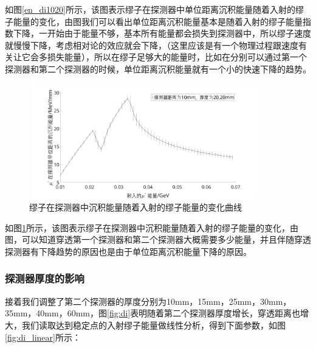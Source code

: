 \documentclass[UTF8]{ctexart}
\begin{document}
如图\ref{en_di1020}所示，该图表示缪子在探测器中单位距离沉积能量随着入射的缪子能量的变化，由图我们可以看出单位距离沉积能量基本是随着入射的缪子能量指数下降，一开始由于能量不够，基本所有能量都会损失到探测器中，所以缪子速度就慢慢下降，考虑相对论的效应就会下降，（这里应该是有一个物理过程跟速度有关让它会多损失能量），所以在缪子足够大的能量时，比如在分别可以通过第一个探测器和第二个探测器的时候，单位距离沉积能量就有一个小的快速下降的趋势。\\

\begin{figure}[H]
    \centering\includegraphics[width=100mm,height=50mm]{pic/de_en_dis_10_se_20.jpg}
    \caption{缪子在探测器中沉积能量随着入射的缪子能量的变化曲线}\label{en1020}
\end{figure}

如图\ref{en1020}所示，该图表示缪子在探测器中沉积能量随着入射的缪子能量的变化，由图，可以知道穿透第一个探测器和第二个探测器大概需要多少能量，并且伴随穿透探测器有下降趋势的原因也是由于单位距离沉积能量下降的原因。

\subsubsection{探测器厚度的影响}

接着我们调整了第二个探测器的厚度分别为10mm，15mm，25mm，30mm，35mm，40mm，60mm，图\ref{fig:di}表明随着第二个探测器厚度增长，穿透距离也增大，我们读取达到稳定点的入射缪子能量做线性分析，得到下面参数，如图\ref{fig:di_linear}所示：\\
\end{document}
